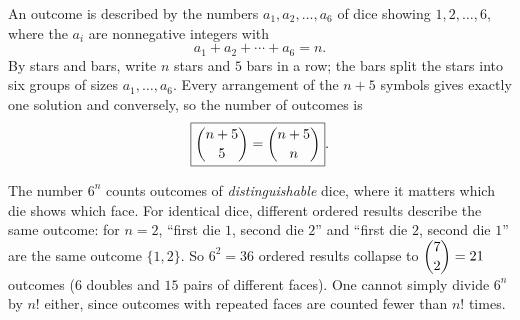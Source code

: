 An outcome is described by the numbers $a_1,a_2,\dots,a_6$ of dice showing $1,2,\dots,6$, where the $a_i$ are nonnegative integers with
\[
a_1+a_2+\cdots+a_6=n .
\]
By stars and bars, write $n$ stars and $5$ bars in a row; the bars split the stars into six groups of sizes $a_1,\dots,a_6$. Every arrangement of the $n+5$ symbols gives exactly one solution and conversely, so the number of outcomes is
\[
\boxed{\dbinom{n+5}{5}=\dbinom{n+5}{n}}.
\]

The number $6^n$ counts outcomes of \emph{distinguishable} dice, where it matters which die shows which face. For identical dice, different ordered results describe the same outcome: for $n=2$, ``first die $1$, second die $2$'' and ``first die $2$, second die $1$'' are the same outcome $\{1,2\}$. So $6^2=36$ ordered results collapse to $\dbinom72=21$ outcomes ($6$ doubles and $15$ pairs of different faces). One cannot simply divide $6^n$ by $n!$ either, since outcomes with repeated faces are counted fewer than $n!$ times.
